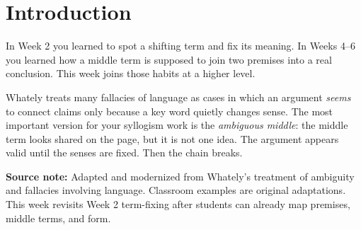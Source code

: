 \documentclass[12pt]{article}
\newcommand{\focusbox}[1]{\par\vspace{0.4em}\noindent\begingroup\setlength{\fboxsep}{6pt}\colorbox{gray!12}{\begin{minipage}{\dimexpr\linewidth-2\fboxsep\relax}#1\end{minipage}}\endgroup\par\vspace{0.5em}}
\begin{document}
\section*{Introduction}
In Week 2 you learned to spot a shifting term and fix its meaning. In Weeks 4--6 you learned how a middle term is supposed to join two premises into a real conclusion. This week joins those habits at a higher level.

Whately treats many fallacies of language as cases in which an argument \textit{seems} to connect claims only because a key word quietly changes sense. The most important version for your syllogism work is the \textit{ambiguous middle}: the middle term looks shared on the page, but it is not one idea. The argument appears valid until the senses are fixed. Then the chain breaks.

\focusbox{\textbf{Source note:} Adapted and modernized from Whately's treatment of ambiguity and fallacies involving language. Classroom examples are original adaptations. This week revisits Week 2 term-fixing after students can already map premises, middle terms, and form.}
\end{document}
